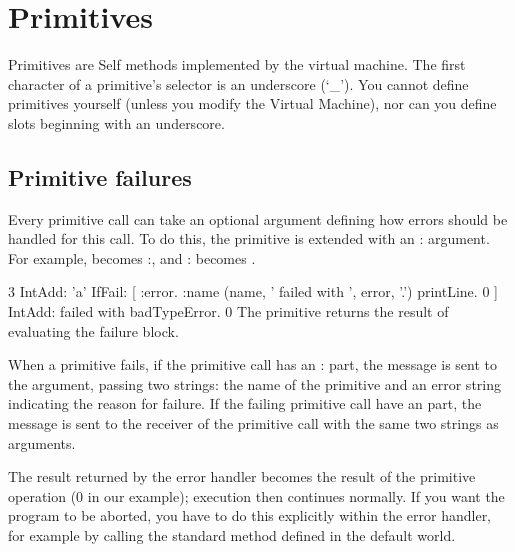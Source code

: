 \documentclass[letterpaper,10pt,english]{sphinxmanual}
\begin{document}
\newpage{}\label{\detokenize{primitives:pp-primitives}}

\section{Primitives}
\label{\detokenize{primitives:primitives}}\label{\detokenize{primitives:pp-primitives}}\label{\detokenize{primitives::doc}}\label{\detokenize{primitives:id1}}
Primitives are Self methods implemented by the virtual machine. The first character of a primitive’s
selector is an underscore (‘\_’). You cannot define primitives yourself (unless you modify the
Virtual Machine), nor can you define slots beginning with an underscore.


\subsection{Primitive failures}
\label{\detokenize{primitives:primitive-failures}}
Every primitive call can take an optional argument defining how errors should be handled for this
call. To do this, the primitive is extended with an : argument. For example, 
becomes :, and : becomes .

\begin{sphinxVerbatim}[commandchars=\\\{\}]
\PYGZgt{} 3 \PYGZus{}IntAdd: ’a’ IfFail: [ \textbar{} :error. :name \textbar{}
(name, ’ failed with ’, error, ’.’) printLine. 0 ]
\PYGZus{}IntAdd: failed with badTypeError.
0        \PYGZdq{}The primitive returns the result of evaluating the failure block.\PYGZdq{}
\PYGZgt{}
\end{sphinxVerbatim}

When a primitive fails, if the primitive call has an : part, the message  is
sent to the  argument, passing two strings: the name of the primitive and an error string
indicating the reason for failure. If the failing primitive call  have an  part, the
message  is sent to the receiver of the primitive call with the same two
strings as arguments.

The result returned by the error handler becomes the result of the primitive operation (0 in our example);
execution then continues normally. If you want the program to be aborted, you have to do
this explicitly within the error handler, for example by calling the standard  method defined
in the default world.
\end{document}
